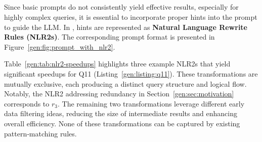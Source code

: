
\subsection{}
\label{gen:sec:approach:nlr2}

Since basic prompts do not consistently yield effective results, especially for highly complex queries, it is essential to incorporate proper hints into the prompt to guide the LLM. In \genrewrite, hints are represented as  \textbf{Natural Language Rewrite Rules (NLR2s)}. The corresponding prompt format is presented in Figure~\ref{gen:fig:prompt_with_nlr2}.









Table~\ref{gen:tab:nlr2-speedups} highlights three example NLR2s that yield significant speedups for Q11 (Listing~\ref{gen:listing:q11}). These transformations are mutually exclusive, each producing a distinct query structure and logical flow. Notably, the NLR2 addressing \sqlunionallcolor redundancy in Section~\ref{gen:sec:motivation} corresponds to  $r_3$. The remaining two transformations leverage different early data filtering ideas, reducing the size of intermediate results and enhancing overall efficiency. None of these transformations can be captured by existing pattern‐matching rules. 





